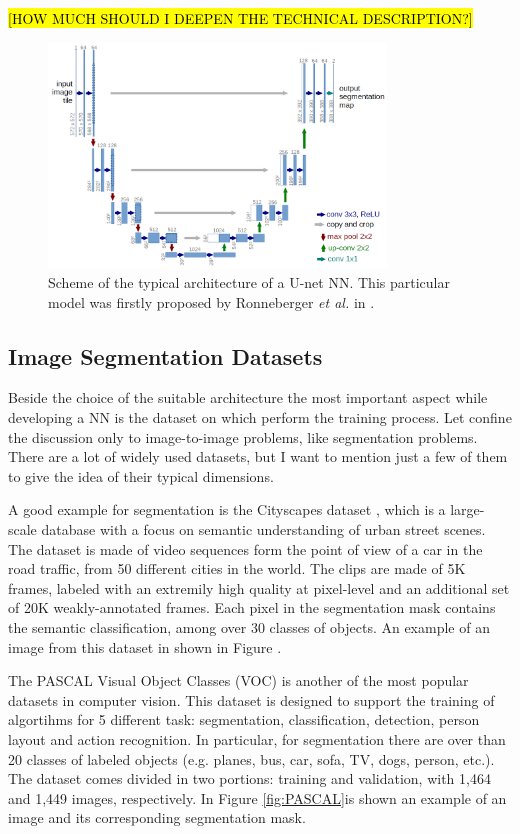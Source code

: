 \hl{[HOW MUCH SHOULD I DEEPEN THE TECHNICAL DESCRIPTION?]}

    \begin{figure}
        \centering
        \includegraphics[width = 0.8\textwidth]{images/unet}
        \caption{Scheme of the typical architecture of a U-net NN. This particular model was firstly proposed by Ronneberger \textit{et al.} in \cite{U-net}.}
        \label{fig:EDNN}
    \end{figure}

\subsection{Image Segmentation Datasets}
Beside the choice of the suitable architecture the most important aspect while developing a NN is the dataset on which perform the training process. Let confine the discussion only to image-to-image problems, like segmentation problems. There are a lot of widely used datasets, but I want to mention just a few of them to give the idea of their typical dimensions.

A good example for segmentation is the Cityscapes dataset \cite{Cityscapes}, which is a large-scale database with a focus on semantic understanding of urban street scenes. The dataset is made of video sequences form the point of view of a car in the road traffic, from 50 different cities in the world. The clips are made of 5K frames, labeled with an extremily high quality at pixel-level and an additional set of 20K weakly-annotated frames. Each pixel in the segmentation mask contains the semantic classification, among over 30 classes of objects. An example of an image from this dataset in shown in Figure \label{fig:seg_example}.

The PASCAL Visual Object Classes (VOC) \cite{PASCAL} is another of the most popular datasets in computer vision. This dataset is designed to support the training of algortihms for 5 different task: segmentation, classification, detection, person layout and action recognition. In particular, for segmentation there are over than 20 classes of labeled objects (e.g. planes, bus, car, sofa, TV, dogs, person, etc.). The dataset comes divided in two portions: training and validation, with 1,464 and 1,449 images, respectively. In Figure \ref{fig:PASCAL}is shown an example of an image and its corresponding segmentation mask.

